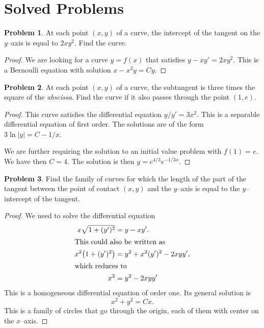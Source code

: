 \documentclass{scrartcl}
\theoremstyle{definition}
\newtheorem*{problem*}{Problem}
\begin{document}
\section*{Solved Problems}
\begin{problem*}
At each point $(x,y)$ of a curve, the intercept of the tangent on the $y$--axis is equal to $2xy^2$.  Find the curve.
\end{problem*}


\begin{proof}
We are looking for a curve $y=f(x)$ that satisfies $y-xy'=2xy^2$.  This is a Bernoulli equation with solution $x-x^2y=Cy$.
\end{proof}

\begin{problem*}
At each point $(x,y)$ of a curve, the subtangent is three times the square of the \emph{abscissa}.  Find the curve if it also passes through the point $(1,e)$.
\end{problem*}

\begin{proof}
This curve satisfies the differential equation $y/y'=3x^2$.  This is a separable differential equation of first order.  The solutions are of the form $3\ln \lvert y \rvert = C- 1/x$.

We are further requiring the solution to an initial value problem with $f(1)=e$.  We have then $C=4$.  The solution is then $y = e^{4/3} e^{-1/3x}$.
\end{proof}


\begin{problem*}
Find the family of curves for which the length of the part of the tangent between the point of contact $(x,y)$ and the $y$--axis is equal to the $y$--intercept of the tangent.
\end{problem*}
\begin{proof}
We need to solve the differential equation
\begin{align*}
x\sqrt{1+(y')^2} &= y-xy'. \\
\intertext{This could also be written as}
x^2 \big( 1 + (y')^2 \big) &= y^2 + x^2(y')^2 - 2xyy', \\
\intertext{which reduces to}
x^2 &= y^2 -2xyy'
\end{align*}
This is a homogeneous differential equation of order one.  Its general solution is
\begin{equation*}
x^2+y^2=Cx.
\end{equation*}
This is a family of circles that go through the origin, each of them with center on the $x$--axis.
\end{proof}
\end{document}
